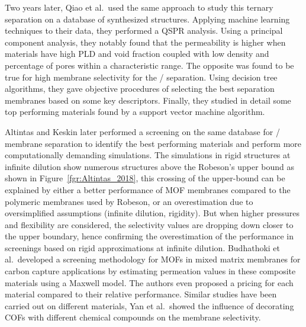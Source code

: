 \documentclass[main.tex]{subfiles}
\begin{document}
Two years later, Qiao et al.\ used the same approach to study this ternary separation on a database of synthesized structures.\autocite{Qiao_2018} Applying machine learning techniques to their data, they performed a QSPR analysis. Using a principal component analysis, they notably found that the permeability is higher when materials have high PLD and void fraction coupled with low density and percentage of pores within a characteristic range. The opposite was found to be true for high membrane selectivity for the / separation. Using decision tree algorithms, they gave objective procedures of selecting the best separation membranes based on some key descriptors. Finally, they studied in detail some top performing materials found by a support vector machine algorithm.

Altintas and Keskin later performed a screening on the same database for / membrane separation to identify the best performing materials and perform more computationally demanding simulations.\autocite{Altintas_2018} {The simulations in rigid structures at infinite dilution show numerous structures above the Robeson's upper bound as shown in Figure~\ref{fgr:Altintas_2018}, this crossing of the upper-bound can be explained by either a better performance of MOF membranes compared to the polymeric membranes used by Robeson, or an overestimation due to oversimplified assumptions (infinite dilution, rigidity). But when higher pressures and flexibility are considered, the selectivity values are dropping down closer to the upper boundary}, hence confirming the overestimation of the performance in screenings {based on rigid approximations at infinite dilution}.  Budhathoki et al.\ developed a screening methodology for MOFs in mixed matrix membranes for carbon capture applications by estimating permeation values in these composite materials using a Maxwell model.\autocite{Budhathoki_2019} The authors even proposed a pricing for each material compared to their relative performance. Similar studies have been carried out on different materials, Yan et al.\ showed the influence of decorating COFs with different chemical compounds on the membrane selectivity.\autocite{Yan_2018}
\end{document}
